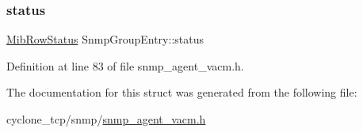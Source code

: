 \subsubsection{\texorpdfstring{status}{status}}
{\footnotesize\ttfamily \hyperlink{mib__common_8h_a40ce1ea958f5c3b04f841d76f5557097}{Mib\+Row\+Status} Snmp\+Group\+Entry\+::status}



Definition at line 83 of file snmp\+\_\+agent\+\_\+vacm.\+h.



The documentation for this struct was generated from the following file\+:\begin{DoxyCompactItemize}
\item 
cyclone\+\_\+tcp/snmp/\hyperlink{snmp__agent__vacm_8h}{snmp\+\_\+agent\+\_\+vacm.\+h}\end{DoxyCompactItemize}
